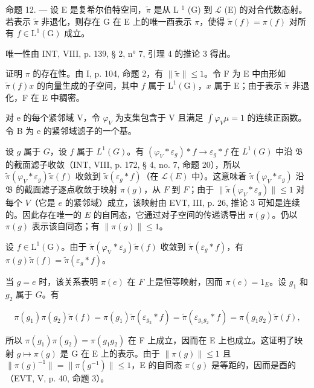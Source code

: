 命题 12. --- 设 E 是复希尔伯特空间，\(\widetilde{\pi}\) 是从 L \(^{1}\) (G) 到 \(\mathcal{L}\) (E) 的对合代数态射。若表示 \(\widetilde{\pi}\) 非退化，则存在 G 在 E 上的唯一酉表示 \(\pi\)，使得 \(\widetilde{\pi}(f)=\pi(f)\) 对所有 \(f\in\mathrm{L}^{1}(\mathrm{G})\) 成立。

唯一性由 INT, VIII, p. 139, § 2, n° 7, 引理 4 的推论 3 得出。

证明 \(\pi\) 的存在性。由 I, p. 104, 命题 2，有 \(\| \widetilde{\pi}\| \leqslant 1\)。令 F 为 E 中由形如 \(\widetilde{\pi}(f)x\) 的向量生成的子空间，其中 \(f\) 属于 \(\mathrm{L}^1 (\mathrm{G})\)，\(x\) 属于 E；由于表示 \(\widetilde{\pi}\) 非退化，F 在 E 中稠密。

对 e 的每个紧邻域 V，令 \(\varphi_{V}\) 为支集包含于 V 且满足 \(\int\varphi_{V}\mu=1\) 的连续正函数。令 B 为 e 的紧邻域滤子的一个基。

设 \(g\) 属于 \(G\)，设 \(f\) 属于 \(L^1(G)\)。有 \((\varphi_V * \varepsilon_g) * f \to \varepsilon_g * f\) 在 \(L^1(G)\) 中沿 \(\mathfrak{B}\) 的截面滤子收敛（INT, VIII, p. 172, § 4, no. 7, 命题 20），所以 \(\widetilde{\pi}(\varphi_V * \varepsilon_g)\widetilde{\pi}(f)\) 收敛到 \(\widetilde{\pi}(\varepsilon_g * f)\)（在 \(\mathcal{L}(E)\) 中）。这意味着 \(\widetilde{\pi}(\varphi_V * \varepsilon_g)\) 沿 \(\mathfrak{B}\) 的截面滤子逐点收敛于映射 \(\pi(g)\)，从 \(F\) 到 \(F\)；由于 \(\| \widetilde{\pi}(\varphi_V * \varepsilon_g) \| \leqslant 1\) 对每个 \(V\)（它是 \(e\) 的紧邻域）成立，该映射由 EVT, III, p. 26, 推论 3 可知是连续的。因此存在唯一的 \(E\) 的自同态，它通过对子空间的传递诱导出 \(\pi(g)\)。仍以 \(\pi(g)\) 表示该自同态；有 \(\| \pi(g) \| \leqslant 1\)。

设 \(f \in \mathrm{L}^1(\mathrm{G})\)。由于 \(\widetilde{\pi}(\varphi_{\mathrm{V}} * \varepsilon_g) \widetilde{\pi}(f)\) 收敛到 \(\widetilde{\pi}(\varepsilon_g * f)\)，有 \(\pi(g) \widetilde{\pi}(f) = \widetilde{\pi}(\varepsilon_g * f)\)。

当 \(g = e\) 时，该关系表明 \(\pi(e)\) 在 \(F\) 上是恒等映射，因而 \(\pi(e) = 1_{E}\)。设 \(g_1\) 和 \(g_2\) 属于 \(G\)。有

\[
\pi (g _ {1}) \pi (g _ {2}) \widetilde {\pi} (f) = \pi (g _ {1}) \widetilde {\pi} (\varepsilon_ {g _ {2}} * f) = \widetilde {\pi} (\varepsilon_ {g _ {1} g _ {2}} * f) = \pi (g _ {1} g _ {2}) \widetilde {\pi} (f),
\]

所以 \(\pi(g_1)\pi(g_2) = \pi(g_1g_2)\) 在 F 上成立，因而在 E 上也成立。这证明了映射 \(g \mapsto \pi(g)\) 是 G 在 E 上的表示。由于 \(\|\pi(g)\| \leqslant 1\) 且 \(\|\pi(g)^{-1}\| = \|\pi(g^{-1})\| \leqslant 1\)，E 的自同态 \(\pi(g)\) 是等距的，因而是酉的（EVT, V, p. 40, 命题 3）。

